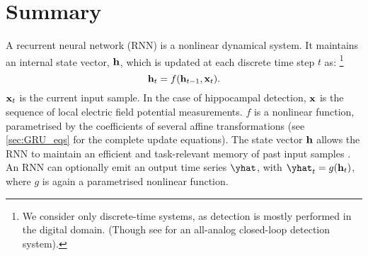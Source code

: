 \documentclass[Master_Thesis.tex]{subfiles}
\begin{document}









\section{Summary}
\label{sec:summary}

A recurrent neural network (RNN) is a nonlinear dynamical system. It maintains an internal state vector, $\vb{h}$, which is updated at each discrete time step $t$ as:
\footnote{We consider only discrete-time systems, as \swr{} detection is mostly performed in the digital domain. (Though see \cite{Ego-Stengel2009} for an all-analog closed-loop \swr{} detection system).}
\[
\vb{h}_t = f(\vb{h}_{t-1}, \vb{x}_t).
\]
$\vb{x}_t$ is the current input sample. In the case of hippocampal \swr{} detection, $\vb{x}$ is the sequence of local electric field potential measurements. $f$ is a nonlinear function, parametrised by the coefficients of several affine transformations (see \cref{sec:GRU_eqs} for the complete update equations). The state vector $\vb{h}$ allows the RNN to maintain an efficient and task-relevant memory of past input samples \cite{LeCun2015}.\footnotemark{} An RNN can optionally emit an output time series $\yhat$, with $\yhat_t = g(\h_t)$, where $g$ is again a parametrised nonlinear function.
\end{document}

